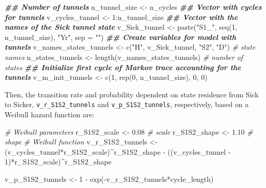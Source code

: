 \documentclass[
]{article}
\newenvironment{Shaded}{\begin{snugshade}}{\end{snugshade}}
\newcommand{\AttributeTok}[1]{\textcolor[rgb]{0.77,0.63,0.00}{#1}}
\newcommand{\CommentTok}[1]{\textcolor[rgb]{0.56,0.35,0.01}{\textit{#1}}}
\newcommand{\DecValTok}[1]{\textcolor[rgb]{0.00,0.00,0.81}{#1}}
\newcommand{\DocumentationTok}[1]{\textcolor[rgb]{0.56,0.35,0.01}{\textbf{\textit{#1}}}}
\newcommand{\FloatTok}[1]{\textcolor[rgb]{0.00,0.00,0.81}{#1}}
\newcommand{\FunctionTok}[1]{\textcolor[rgb]{0.00,0.00,0.00}{#1}}
\newcommand{\NormalTok}[1]{#1}
\newcommand{\OtherTok}[1]{\textcolor[rgb]{0.56,0.35,0.01}{#1}}
\newcommand{\SpecialCharTok}[1]{\textcolor[rgb]{0.00,0.00,0.00}{#1}}
\newcommand{\StringTok}[1]{\textcolor[rgb]{0.31,0.60,0.02}{#1}}
\begin{document}
\begin{Shaded}
\begin{Highlighting}[]
\DocumentationTok{\#\# Number of tunnels}
\NormalTok{n\_tunnel\_size }\OtherTok{\textless{}{-}}\NormalTok{ n\_cycles }
\DocumentationTok{\#\# Vector with cycles for tunnels}
\NormalTok{v\_cycles\_tunnel }\OtherTok{\textless{}{-}} \DecValTok{1}\SpecialCharTok{:}\NormalTok{n\_tunnel\_size}
\DocumentationTok{\#\# Vector with the names of the Sick tunnel state}
\NormalTok{v\_Sick\_tunnel }\OtherTok{\textless{}{-}} \FunctionTok{paste}\NormalTok{(}\StringTok{"S1\_"}\NormalTok{, }\FunctionTok{seq}\NormalTok{(}\DecValTok{1}\NormalTok{, n\_tunnel\_size), }\StringTok{"Yr"}\NormalTok{, }\AttributeTok{sep =} \StringTok{""}\NormalTok{)}
\DocumentationTok{\#\# Create variables for model with tunnels}
\NormalTok{v\_names\_states\_tunnels }\OtherTok{\textless{}{-}} \FunctionTok{c}\NormalTok{(}\StringTok{"H"}\NormalTok{, v\_Sick\_tunnel, }\StringTok{"S2"}\NormalTok{, }\StringTok{"D"}\NormalTok{) }\CommentTok{\# state names}
\NormalTok{n\_states\_tunnels }\OtherTok{\textless{}{-}} \FunctionTok{length}\NormalTok{(v\_names\_states\_tunnels)         }\CommentTok{\# number of states}
\DocumentationTok{\#\# Initialize first cycle of Markov trace accounting for the tunnels}
\NormalTok{v\_m\_init\_tunnels }\OtherTok{\textless{}{-}} \FunctionTok{c}\NormalTok{(}\DecValTok{1}\NormalTok{, }\FunctionTok{rep}\NormalTok{(}\DecValTok{0}\NormalTok{, n\_tunnel\_size), }\DecValTok{0}\NormalTok{, }\DecValTok{0}\NormalTok{) }
\end{Highlighting}
\end{Shaded}

Then, the transition rate and probability dependent on state residence from Sick to Sicker, \texttt{v\_r\_S1S2\_tunnels} and \texttt{v\_p\_S1S2\_tunnels}, respectively, based on a Weibull hazard function are:

\begin{Shaded}
\begin{Highlighting}[]
\CommentTok{\# Weibull parameters}
\NormalTok{r\_S1S2\_scale }\OtherTok{\textless{}{-}} \FloatTok{0.08} \CommentTok{\# scale}
\NormalTok{r\_S1S2\_shape }\OtherTok{\textless{}{-}} \FloatTok{1.10} \CommentTok{\# shape}
\CommentTok{\# Weibull function}
\NormalTok{v\_r\_S1S2\_tunnels }\OtherTok{\textless{}{-}}\NormalTok{ (v\_cycles\_tunnel}\SpecialCharTok{*}\NormalTok{r\_S1S2\_scale)}\SpecialCharTok{\^{}}\NormalTok{r\_S1S2\_shape }\SpecialCharTok{{-}}
\NormalTok{                    ((v\_cycles\_tunnel }\SpecialCharTok{{-}} \DecValTok{1}\NormalTok{)}\SpecialCharTok{*}\NormalTok{r\_S1S2\_scale)}\SpecialCharTok{\^{}}\NormalTok{r\_S1S2\_shape}
                    
\NormalTok{v\_p\_S1S2\_tunnels }\OtherTok{\textless{}{-}} \DecValTok{1} \SpecialCharTok{{-}} \FunctionTok{exp}\NormalTok{(}\SpecialCharTok{{-}}\NormalTok{v\_r\_S1S2\_tunnels}\SpecialCharTok{*}\NormalTok{cycle\_length)}
\end{Highlighting}
\end{Shaded}
\end{document}
